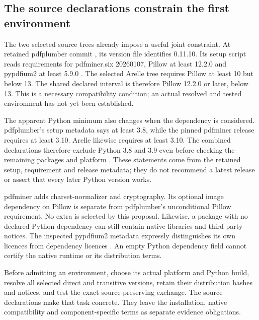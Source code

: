 \subsection{The source declarations constrain the first environment}
\label{sec:reuse-dependency-frontier}

The two selected source trees already impose a useful joint constraint.
At retained pdfplumber commit
, its version file identifies
0.11.10. Its setup script reads requirements for pdfminer.six 20260107,
Pillow at least 12.2.0 and pypdfium2 at least 5.9.0
\citep{pdfplumberdependencies2026}. The selected Arelle tree
requires Pillow at least 10 but below 13. The shared declared interval is
therefore Pillow 12.2.0 or later, below 13. This is a necessary compatibility
condition; an actual resolved and tested environment has not yet been established.

The apparent Python minimum also changes when the dependency is considered.
pdfplumber's setup metadata says at least 3.8, while the pinned pdfminer release
requires at least 3.10. Arelle likewise requires at least 3.10. The combined
declarations therefore exclude Python 3.8 and 3.9 even before checking the
remaining packages and platform \citep{arellepinned2026,pdfminermetadata2026}.
These statements come from the retained
setup, requirement and release metadata; they do not recommend a latest release
or assert that every later Python version works.

pdfminer adds charset-normalizer and cryptography. Its optional image dependency
on Pillow is separate from pdfplumber's unconditional Pillow requirement.
No extra is selected by this proposal. Likewise, a package with no declared
Python dependency can still contain native libraries and third-party notices.
The inspected pypdfium2 metadata expressly distinguishes its own licences from
dependency licences \citep{pypdfiummetadata2026}. An empty Python dependency field cannot certify the
native runtime or its distribution terms.

Before admitting an environment, choose its actual platform and Python build,
resolve all selected direct and transitive versions, retain their distribution
hashes and notices, and test the exact source-preserving exchange. The source
declarations make that task concrete. They leave the installation, native
compatibility and component-specific terms as separate evidence obligations.
